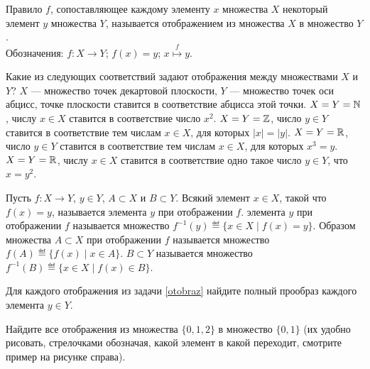 \documentclass[a4paper,12pt]{article}
\begin{document}

Правило $f$, сопоставляющее каждому элементу $x$
множества $X$ некоторый элемент $y$ множества $Y$, называется  отображением из множества $X$ в множество $Y$. \\
Обозначения: $f\colon X \to Y$; $f(x)= y$; $x\stackrel{f}{\mapsto} y$.



\label{otobraz}
Какие из следующих соответствий задают отображения между
множествами $X$ и $Y$?
$X$ --- множество точек декартовой плоскости,
$Y$ --- множество точек оси абцисс, точке плоскости
ставится в соответствие абцисса этой точки.
$X=Y=\mathbb{N}$, числу $x\in X$ ставится в соответствие число $x^2$.
$X=Y=\mathbb{Z}$, число $y\in Y$ ставится в соответствие тем числам $x\in X$,
для которых $|x|=|y|$.
$X=Y=\mathbb{R}$, число $y\in Y$ ставится в соответствие тем числам $x\in X$,
для которых $x^3=y$.
$X=Y=\mathbb{R}$,
числу $x\in X$ ставится в соответствие одно такое число $y\in Y$, что $x=y^2$.


Пусть $f\colon X\to Y$, $y\in Y$, $A\subset X$ и $B\subset Y$.
Всякий элемент $x\in X$, такой что $f(x)=y$, называется
 элемента $y$ при отображении $f$.
 элемента $y$ при отображении
$f$ называется множество $f^{-1}(y)\eqdef\{x\in X\mid f(x)=y\}$.
{ Образом множества\/} $A\subset X$ при отображении $f$ называется
множество $f(A)\eqdef\{f(x)\mid x\in A\}$.
$B\subset Y$ называется множество $f^{-1}(B)\eqdef\{x\in X\mid f(x)\in B\}$.


Для каждого отображения из задачи \ref{otobraz} найдите
полный прообраз каждого элемента $y\in Y$.


Найдите все отображения из множества $\{0, 1, 2\}$  в множество
$\{0, 1\}$ (их удобно рисовать, стрелочками обозначая, какой элемент
в какой переходит, смотрите пример на рисунке справа).

\end{document}

